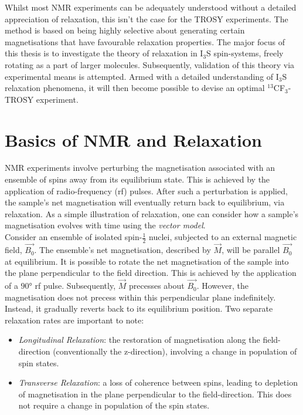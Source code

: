 Whilst most NMR experiments can be adequately understood without a detailed appreciation of relaxation, this isn't the case for the TROSY experiments. The method is based on being highly selective about generating certain magnetisations that have favourable relaxation properties. The major focus of this thesis is to investigate the theory of relaxation in I$_3$S spin-systems, freely rotating as a part of larger molecules. Subsequently, validation of this theory via experimental means is attempted. Armed with a detailed understanding of I$_3$S relaxation phenomena, it will then become possible to devise an optimal $^{13}$CF$_3$-TROSY experiment.
\section{Basics of NMR and Relaxation} \label{sec1.1}
NMR experiments involve perturbing the magnetisation associated with an ensemble of spins away from its equilibrium state. This is achieved by the application of radio-frequency (rf) pulses. After such a perturbation is applied, the sample's net magnetisation will eventually return back to equilibrium, via relaxation. As a simple illustration of relaxation, one can consider how a sample's magnetisation evolves with time using the \textit{vector model}\cite{RN39}.\\ Consider an ensemble of isolated spin-$\frac{1}{2}$ nuclei, subjected to an external magnetic field, $\vec{B_0}$. The ensemble's net magnetisation, described by $\vec{M}$, will be parallel $\vec{B_0}$ at equilibrium. It is possible to rotate the net magnetisation of the sample into the plane perpendicular to the field direction. This is achieved by the application of a $\ang{90}$ rf pulse. Subsequently, $\vec{M}$ precesses about $\vec{B_0}$. However, the magnetisation does not precess within this perpendicular plane indefinitely. Instead, it gradually reverts back to its equilibrium position. Two separate relaxation rates are important to note:
\begin{itemize}
\item \textit{Longitudinal Relaxation}: the restoration of magnetisation along the field-direction (conventionally the z-direction), involving a change in population of spin states.
\item \textit{Transverse Relaxation}: a loss of coherence between spins, leading to depletion of magnetisation in the plane perpendicular to the field-direction. This does not require a change in population of the spin states.
\end{itemize}
